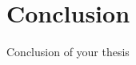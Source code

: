 \documentclass[Thesis.tex]{subfiles}
\begin{document}
\setcounter{section}{4}

\section{Conclusion}
\label{sec:con}

Conclusion of your thesis
\end{document}
